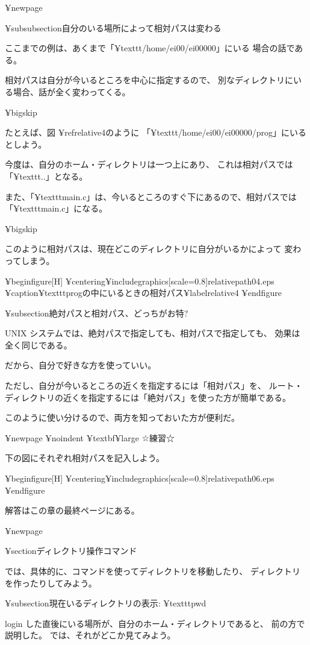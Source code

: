 {¥newpage

¥subsubsection{自分のいる場所によって相対パスは変わる}

ここまでの例は、あくまで「¥texttt{/home/ei00/ei00000}」にいる
場合の話である。

相対パスは自分が今いるところを中心に指定するので、
別なディレクトリにいる場合、話が全く変わってくる。

¥bigskip

たとえば、図 ¥ref{relative4}のように
「¥texttt{/home/ei00/ei00000/prog}」にいるとしよう。

今度は、自分のホーム・ディレクトリは一つ上にあり、
これは相対パスでは「¥texttt{..}」となる。

また、「¥texttt{main.c}」は、今いるところのすぐ下にあるので、相対パスでは
「¥texttt{main.c}」になる。

¥bigskip

このように相対パスは、現在どこのディレクトリに自分がいるかによって
変わってしまう。

¥begin{figure}[H]
¥centering{¥includegraphics[scale=0.8]{relativepath04.eps}}
¥caption{¥texttt{prog}の中にいるときの相対パス}¥label{relative4}
¥end{figure}

¥subsection{絶対パスと相対パス、どっちがお特?}

 UNIX システムでは、絶対パスで指定しても、相対パスで指定しても、
効果は全く同じである。

だから、自分で好きな方を使っていい。

ただし、自分が今いるところの近くを指定するには「相対パス」を、
ルート・ディレクトリの近くを指定するには「絶対パス」を使った方が簡単である。

このように使い分けるので、両方を知っておいた方が便利だ。

¥newpage
¥noindent
¥textbf{¥large ☆練習☆}

下の図にそれぞれ相対パスを記入しよう。

¥begin{figure}[H]
¥centering{¥includegraphics[scale=0.8]{relativepath06.eps}}
¥end{figure}

解答はこの章の最終ページにある。

¥newpage

¥section{ディレクトリ操作コマンド}

では、具体的に、コマンドを使ってディレクトリを移動したり、
ディレクトリを作ったりしてみよう。

¥subsection{現在いるディレクトリの表示: ¥texttt{pwd}}

login した直後にいる場所が、自分のホーム・ディレクトリであると、
前の方で説明した。
では、それがどこか見てみよう。

}
